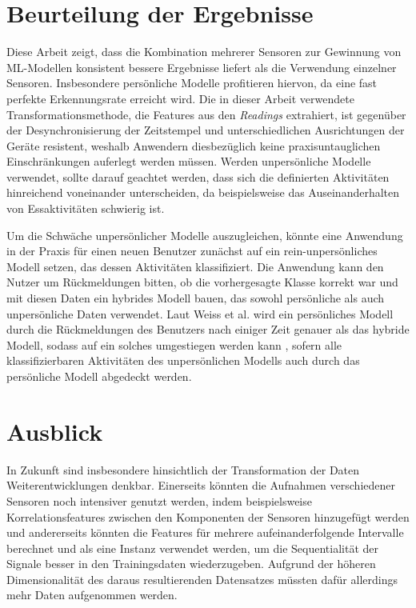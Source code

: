 \section{Beurteilung der Ergebnisse}
Diese Arbeit zeigt, dass die Kombination mehrerer Sensoren zur Gewinnung von \acs{ML}-Modellen konsistent bessere Ergebnisse liefert als die Verwendung einzelner Sensoren. Insbesondere persönliche Modelle profitieren hiervon, da eine fast perfekte Erkennungsrate erreicht wird. Die in dieser Arbeit verwendete Transformationsmethode, die Features aus den \textit{Readings} extrahiert, ist gegenüber der Desynchronisierung der Zeitstempel und unterschiedlichen Ausrichtungen der Geräte resistent, weshalb Anwendern diesbezüglich keine praxisuntauglichen Einschränkungen auferlegt werden müssen. Werden unpersönliche Modelle verwendet, sollte darauf geachtet werden, dass sich die definierten Aktivitäten hinreichend voneinander unterscheiden, da beispielsweise das Auseinanderhalten von Essaktivitäten schwierig ist.

Um die Schwäche unpersönlicher Modelle auszugleichen, könnte eine Anwendung in der Praxis für einen neuen Benutzer zunächst auf ein rein-unpersönliches Modell setzen, das dessen Aktivitäten klassifiziert. Die Anwendung kann den Nutzer um Rückmeldungen bitten, ob die vorhergesagte Klasse korrekt war und mit diesen Daten ein hybrides Modell bauen, das sowohl persönliche als auch unpersönliche Daten verwendet. Laut Weiss et al. wird ein persönliches Modell durch die Rückmeldungen des Benutzers nach einiger Zeit genauer als das hybride Modell, sodass auf ein solches umgestiegen werden kann \cite{Weiss2012}, sofern alle klassifizierbaren Aktivitäten des unpersönlichen Modells auch durch das persönliche Modell abgedeckt werden.

\section{Ausblick}
In Zukunft sind insbesondere hinsichtlich der Transformation der Daten Weiterentwicklungen denkbar. Einerseits könnten die Aufnahmen verschiedener Sensoren noch intensiver genutzt werden, indem beispielsweise Korrelationsfeatures zwischen den Komponenten der Sensoren hinzugefügt werden und andererseits könnten die Features für mehrere aufeinanderfolgende Intervalle berechnet und als eine Instanz verwendet werden, um die Sequentialität der Signale besser in den Trainingsdaten wiederzugeben. Aufgrund der höheren Dimensionalität des daraus resultierenden Datensatzes müssten dafür allerdings mehr Daten aufgenommen werden.

